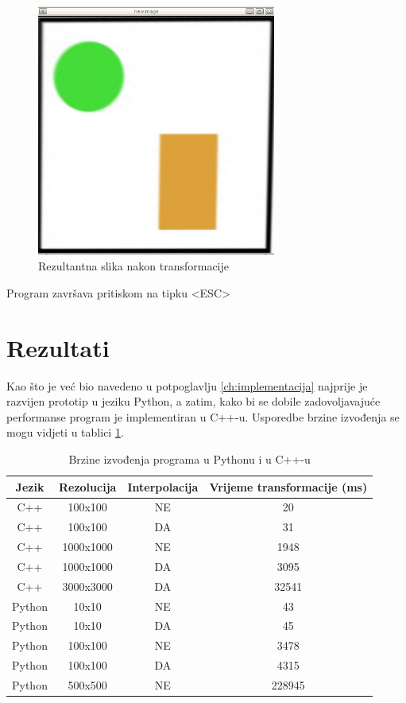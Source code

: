 \begin{figure}[ht]
	\centering
	\includegraphics[width=0.7\textwidth]{figures/transformedImage.jpg}
	\caption{Rezultantna slika nakon transformacije}
	\label{fig:transformiranaSlika}
\end{figure}

Program završava pritiskom na tipku <ESC>

\section{Rezultati}
\label{sec:rezultati}

Kao što je već bio navedeno u potpoglavlju \ref{ch:implementacija} najprije je razvijen prototip u jeziku Python, a zatim, kako bi se dobile zadovoljavajuće performanse program je implementiran u C++-u. Usporedbe brzine izvođenja se mogu vidjeti u tablici \ref{table:brzine}.

\begin{table}[ht]
\caption{Brzine izvođenja programa u Pythonu i u C++-u}
\label{table:brzine}
\centering
\begin{tabular}{ | c | c | c | c | }
\hline\hline
Jezik & Rezolucija & Interpolacija & Vrijeme transformacije (ms) \\
%
\hline
C++ & 100x100 & NE & 20 \\
C++ & 100x100 & DA & 31 \\
C++ & 1000x1000 & NE & 1948 \\
C++ & 1000x1000 & DA & 3095 \\
C++ & 3000x3000 & DA & 32541 \\
Python & 10x10 & NE & 43 \\
Python & 10x10 & DA & 45 \\
Python & 100x100 & NE & 3478 \\
Python & 100x100 & DA & 4315 \\
Python & 500x500 & NE & 228945 \\
\hline
\end{tabular}
\end{table}

